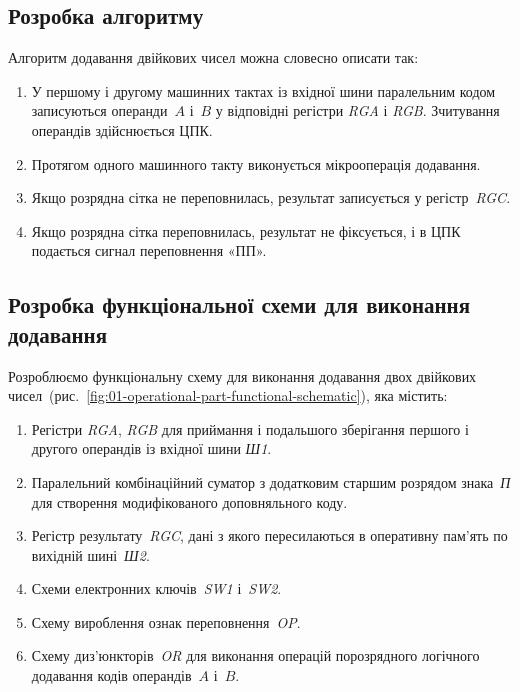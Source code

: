\documentclass[
	a4paper,
	oneside,
	DIV = 12,
	12pt,
	headings = normal,
]{scrartcl}
\newcommand\schel[1]{\textit{#1}}
\begin{document}
		\subsection{Розробка алгоритму}
			Алгоритм додавання двійкових чисел можна словесно описати так:
			\begin{enumerate}
				\item У першому і другому машинних тактах із вхідної шини паралельним кодом записуються операнди~$A$ і~$B$ у відповідні регістри \schel{RGA} і \schel{RGB}. Зчитування операндів здійснюється ЦПК.
				\item Протягом одного машинного такту виконується мікрооперація додавання.
				\item Якщо розрядна сітка не переповнилась, результат записується у регістр~\schel{RGC}.
				\item Якщо розрядна сітка переповнилась, результат не фіксується, і в ЦПК подається сигнал переповнення «ПП».
			\end{enumerate}

		\subsection{Розробка функціональної схеми для виконання додавання}
			Розроблюємо функціональну схему для виконання додавання двох двійкових чисел~(рис.~\ref{fig:01-operational-part-functional-schematic}), яка містить:
			\begin{enumerate}
				\item Регістри \schel{RGA}, \schel{RGB} для приймання і подальшого зберігання першого і другого операндів із вхідної шини \schel{Ш1}.
				\item Паралельний комбінаційний суматор з додатковим старшим розрядом знака~\schel{П} для створення модифікованого доповняльного коду.
				\item Регістр результату~\schel{RGC}, дані з якого пересилаються в оперативну пам'ять по вихідній шині~\schel{Ш2}.
				\item Схеми електронних ключів~\schel{SW1} і~\schel{SW2}.
				\item Схему вироблення ознак переповнення~\schel{OP}.
				\item Схему диз'юнкторів~\schel{OR} для виконання операцій порозрядного логічного додавання кодів операндів~$A$ і~$B$.
			\end{enumerate}
\end{document}
